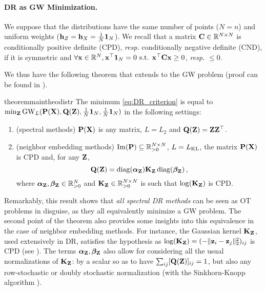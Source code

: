 \paragraph{DR as GW Minimization.} We suppose that the distributions have the same number of points ($N = n$) and uniform weights (${\mathbf{h}}_Z = {\mathbf{h}}_X = \frac{1}{N} \bm{1}_N$). We recall that a matrix ${\mathbf{C}} \in \mathbb{R}^{N \times N}$ is conditionally positive definite (CPD), \textit{resp.} conditionally negative definite (CND), if it is symmetric and $\forall {\mathbf{x}} \in \mathbb{R}^{N}, {\mathbf{x}}^\top \mathbf{1}_N = 0 \text{ s.t. } {\mathbf{x}}^\top {\mathbf{C}} {\mathbf{x}} \geq 0$, \textit{resp.} $\leq 0$. 



We thus have the following theorem that extends  to the GW problem (proof can be found in ).
\begin{restatable}{theorem}{maintheodistr}
\label{theo:main_theo}
The minimum \cref{eq:DR_criterion} is equal to $\min_{{\mathbf{Z}}}\operatorname{GW}_L({\mathbf{P}}({\mathbf{X}}), {\mathbf{Q}}({\mathbf{Z}}), \frac{1}{N}\bm{1}_N, \frac{1}{N}\bm{1}_N)$ in the following settings:
\begin{enumerate}[label=(\roman*), rightmargin=25pt]
\item (spectral methods)  ${\mathbf{P}}({\mathbf{X}})$ is any matrix, $L = L_2$ and ${\mathbf{Q}}({\mathbf{Z}}) = {\mathbf{Z}} {\mathbf{Z}}^\top$. 
\item (neighbor embedding methods) $\operatorname{Im}({\mathbf{P}}) \subseteq \mathbb{R}_{>0}^{N \times N}$, $L = L_{\operatorname{KL}}$, the matrix ${\mathbf{P}}({\mathbf{X}})$ is CPD and, for any ${\mathbf{Z}}$,
\begin{equation}
{\mathbf{Q}}({\mathbf{Z}}) = \operatorname{diag}(\boldsymbol\alpha_{\mathbf{Z}}) {\mathbf{K}}_{\mathbf{Z}} \operatorname{diag}(\boldsymbol\beta_{\mathbf{Z}})\,,
\end{equation}
where $\boldsymbol\alpha_{\mathbf{Z}}, \boldsymbol\beta_{\mathbf{Z}} \in \mathbb{R}^{N}_{> 0}$ and ${\mathbf{K}}_{\mathbf{Z}} \in \mathbb{R}^{N \times N}_{> 0}$ is such that $\log({\mathbf{K}}_{\mathbf{Z}})$ is CPD.
\end{enumerate}
\end{restatable}

Remarkably, this result shows that \emph{all spectral DR methods} can be seen as OT problems in disguise, as they all equivalently minimize a GW problem. The second point of the theorem also provides some insights into this equivalence in the case of neighbor embedding methods. For instance, the Gaussian kernel ${\mathbf{K}}_{\mathbf{Z}}$, used extensively in DR, satisfies the hypothesis as $\log({\mathbf{K}}_{\mathbf{Z}}) = (-\|{\mathbf{z}}_i-{\mathbf{z}}_j\|_2^2)_{ij}$ is CPD (see \eg \citealt{maron2018probably}). The terms $\boldsymbol\alpha_{\mathbf{Z}}, \boldsymbol\beta_{\mathbf{Z}}$ also allow for considering all the usual normalizations of ${\mathbf{K}}_{\mathbf{Z}}$: by a scalar so as to have $\sum_{ij} [{\mathbf{Q}}({\mathbf{Z}})]_{ij}=1$, but also any row-stochastic or doubly stochastic normalization (with the Sinkhorn-Knopp algorithm \citealt{sinkhorn1967concerning}).

